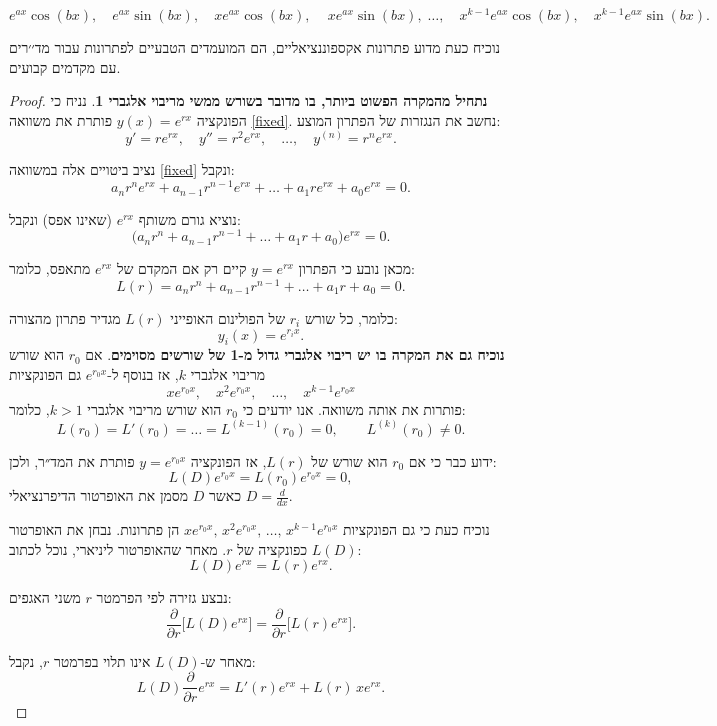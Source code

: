 \documentclass{article}
\numberwithin{equation}{section}
\begin{document}
\[
e^{ax}\cos(bx), \quad e^{ax}\sin(bx), \quad x e^{ax}\cos(bx), \quad\, x e^{ax}\sin(bx),\; \dots, \quad x^{k-1} e^{ax}\cos(bx), \quad x^{k-1} e^{ax}\sin(bx).
\]

נוכיח כעת מדוע פתרונות אקספוננציאליים, הם המועמדים הטבעיים לפתרונות עבור מד׳׳רים עם מקדמים קבועים.

\begin{proof}
\textbf{
נתחיל מהמקרה הפשוט ביותר, בו מדובר בשורש ממשי מריבוי אלגברי 1}.
נניח כי הפונקציה $y(x)=e^{rx}$ פותרת את משוואה \ref{fixed}.
נחשב את הנגזרות של הפתרון המוצע:
\[
y' = r e^{rx}, \quad y'' = r^2 e^{rx}, \quad \dots, \quad y^{(n)} = r^n e^{rx}.
\]

נציב ביטויים אלה במשוואה \ref{fixed} ונקבל:
\[
a_n r^n e^{rx} + a_{n-1} r^{n-1} e^{rx} + \dots + a_1 r e^{rx} + a_0 e^{rx} = 0.
\]

נוציא גורם משותף $e^{rx}$ (שאינו אפס) ונקבל:
\[
\big(a_n r^n + a_{n-1} r^{n-1} + \dots + a_1 r + a_0 \big) e^{rx} = 0.
\]

מכאן נובע כי הפתרון $y=e^{rx}$ קיים רק אם המקדם של $e^{rx}$ מתאפס, כלומר:
\[
L(r) = a_n r^n + a_{n-1} r^{n-1} + \dots + a_1 r + a_0 = 0.
\]

כלומר, כל שורש $r_i$ של הפולינום האופייני $L(r)$ מגדיר פתרון מהצורה:
\[
y_i(x) = e^{r_i x}.
\]
\textbf{
נוכיח גם את המקרה בו יש ריבוי אלגברי גדול מ-1 של שורשים מסוימים}.
אם $r_0$ הוא שורש מריבוי אלגברי $k$, אז בנוסף ל-$e^{r_0 x}$ גם הפונקציות
\[
x e^{r_0 x}, \quad x^2 e^{r_0 x}, \quad \dots, \quad x^{k-1} e^{r_0 x}
\]
פותרות את אותה משוואה.
אנו יודעים כי $r_0$ הוא שורש מריבוי אלגברי $k>1$, כלומר:
\[
L(r_0) = L'(r_0) = \dots = L^{(k-1)}(r_0) = 0, \qquad L^{(k)}(r_0) \neq 0.
\]

ידוע כבר כי אם $r_0$ הוא שורש של $L(r)$, אז הפונקציה $y=e^{r_0 x}$ פותרת את המד״ר, ולכן:
\begin{equation}
L(D)e^{r_0 x} = L(r_0)e^{r_0 x} = 0,
\end{equation}
כאשר $D$ מסמן את האופרטור הדיפרנציאלי $D=\tfrac{d}{dx}$.

נוכיח כעת כי גם הפונקציות $x e^{r_0 x},\, x^2 e^{r_0 x},\, \dots,\, x^{k-1} e^{r_0 x}$ הן פתרונות.  
נבחן את האופרטור $L(D)$ כפונקציה של $r$.  
מאחר שהאופרטור ליניארי, נוכל לכתוב:
\[
L(D)e^{rx} = L(r)e^{rx}.
\]

נבצע גזירה לפי הפרמטר $r$ משני האגפים:
\[
\frac{\partial}{\partial r}\big[L(D)e^{rx}\big]
= \frac{\partial}{\partial r}\big[L(r)e^{rx}\big].
\]

מאחר ש-$L(D)$ אינו תלוי בפרמטר $r$, נקבל:
\[
L(D)\frac{\partial}{\partial r}e^{rx} = L'(r)e^{rx} + L(r)\,x e^{rx}.
\]


\end{proof}
\end{document}
